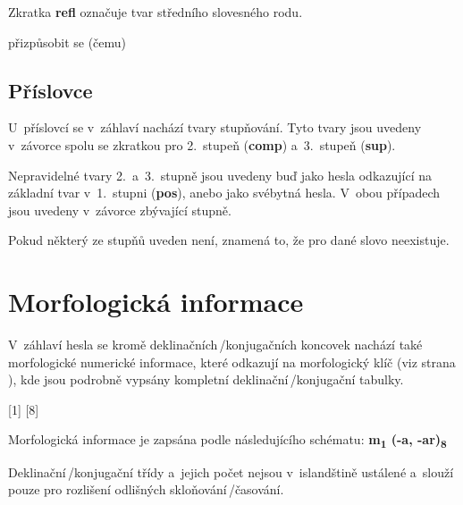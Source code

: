 Zkratka \textbf{refl} označuje tvar středního slovesného rodu.

\blspace
  \dicEntry {}    {}  {přizpůsobit se (čemu)}
\blspace

\subsection*{Příslovce}

U~příslovcí se v~záhlaví nachází tvary stupňování. Tyto tvary jsou uvedeny v~závorce spolu se zkratkou pro 2.~stupeň (\textbf{comp}) a~3.~stupeň (\textbf{sup}).

\blspace
  \dicEntry {}  
\blspace

Nepravidelné tvary 2.~a~3.~stupně jsou uvedeny buď jako hesla odkazující na základní tvar v~1.~stupni (\textbf{pos}), anebo jako svébytná hesla. V~obou případech jsou uvedeny v~závorce zbývající stupně.

\blspace
  \dicEntry {}  
\blspace

Pokud některý ze stupňů uveden není, znamená to, že pro dané slovo neexistuje.

\blspace
  \dicEntry {}  
\blspace

\section{Morfologická informace} \label{sec:dec}

V~záhlaví hesla se kromě deklinačních\,/\addthin konjugačních koncovek nachází také morfologické numerické informace, které odkazují na morfologický klíč (viz strana \pageref{sec:morpho}), kde jsou podrobně vypsány kompletní deklinační\,/\addthin konjugační tabulky.

\blspace
  \dicEntry {} [1] [8]
\blspace

Morfologická informace je zapsána podle následujícího schématu: \textbf{m{\textsubscript{1}} (-a, -ar){\textsubscript{8}}}

\blspace
\tableB
\blspace

Deklinační\,/\addthin konjugační třídy a~jejich počet nejsou v~islandštině ustálené a~slouží pouze pro rozlišení odlišných skloňování\,/\addthin časování.

